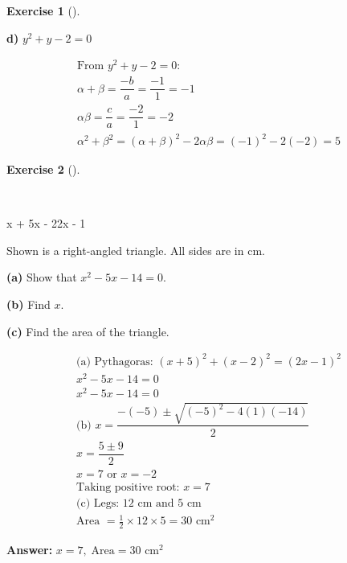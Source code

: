 \documentclass[
  letterpaper,
  DIV=11,
  numbers=noendperiod]{scrreprt}
\theoremstyle{definition}
\newtheorem{exercise}{Exercise}[chapter]
\theoremstyle{remark}
\begin{document}
\begin{exercise}[]
\begin{tcolorbox}
\textbf{d)} \(\displaystyle y^2 + y - 2 = 0\)

\begin{align*}
\text{From } y^2 + y - 2 = 0: \\ \alpha + \beta = \dfrac{-b}{a} = \dfrac{-1}{1} = -1 \\ \alpha\beta = \dfrac{c}{a} = \dfrac{-2}{1} = -2 \\ \alpha^2 + \beta^2 = (\alpha+\beta)^2 - 2\alpha\beta = (-1)^2 - 2(-2) = 5
\end{align*}

\end{tcolorbox}

\end{exercise}

\begin{exercise}[]\protect\hypertarget{exr-u6-29-1}{}\label{exr-u6-29-1}

~

x + 5x - 22x - 1

Shown is a right-angled triangle. All sides are in cm.

\textbf{(a)} Show that \(x^2 - 5x - 14 = 0\).

\textbf{(b)} Find \(x\).

\textbf{(c)} Find the area of the triangle.

\begin{tcolorbox}[enhanced jigsaw, opacitybacktitle=0.6, coltitle=black, arc=.35mm, colframe=quarto-callout-tip-color-frame, colback=white, bottomrule=.15mm, left=2mm, colbacktitle=quarto-callout-tip-color!10!white, titlerule=0mm, opacityback=0, title=\textcolor{quarto-callout-tip-color}{\faLightbulb}\hspace{0.5em}{🔍 View Solution}, leftrule=.75mm, breakable, rightrule=.15mm, bottomtitle=1mm, toptitle=1mm, toprule=.15mm]

\begin{align*}
\text{(a) Pythagoras: } (x + 5)^2 + (x - 2)^2 = (2x - 1)^2 \\ x^2 -5x -14 = 0 \\ x^2 - 5x - 14 = 0 \\ \text{(b) } x = \dfrac{-(-5) \pm \sqrt{(-5)^2 - 4(1)(-14)}}{2} \\ x = \dfrac{5 \pm 9}{2} \\ x = 7 \text{ or } x = -2 \\ \text{Taking positive root: } x = 7 \\ \text{(c) Legs: } 12 \text{ cm and } 5 \text{ cm} \\ \text{Area } = \tfrac{1}{2} \times 12 \times 5 = 30 \text{ cm}^2
\end{align*}

\textbf{Answer:} \(x = 7,\; \text{Area} = 30 \text{ cm}^2\)

\end{tcolorbox}

\end{exercise}
\end{document}
